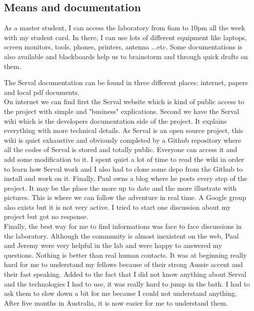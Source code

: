 \subsection{Means and documentation}
As a master student, I can access the laboratory from 6am to 10pm all the week with my student card. In there, I can use lots of different equipment like laptops, screen monitors, tools, phones, printers, antenna ...etc. Some documentations is also available and blackboards help us to brainstorm and through quick drafts on them.
\par
The Serval documentation can be found in three different places: internet, papers and local pdf documents. 
\\
On internet we can find first the Serval website which is kind of public access to the project with simple and "business" explications. Second we have the Serval wiki which is the developers documentation side of the project. It explains everything with more technical details. As Serval is an open source project, this wiki is quiet exhaustive and obviously completed by a Github repository where all the codes of Serval is stored and totally public. Everyone can access it and add some modification to it. I spent quiet a lot of time to read the wiki in order to learn how Serval work and I also had to clone some depo from the Github to install and work on it. Finally, Paul owns a blog where he posts every step of the project. It may be the place the more up to date and the more illustrate with pictures. This is where we can follow the adventure in real time. A Google group also exists but it is not very active. I tried to start one discussion about my project but got no response.
\\Finally, the best way for me to find informations was face to face discussions in the laboratory. Although the community is almost inexistent on the web, Paul and Jeremy were very helpful in the lab and were happy to answered my questions. Nothing is better than real human contacts. It was at beginning really hard for me to understand my fellows because of their strong Aussie accent and their fast speaking. Added to the fact that I did not know anything about Serval and the technologies I had to use, it was really hard to jump in the bath. I had to ask them to slow down a bit for me because I could not understand anything. After five months in Australia, it is now easier for me to understand them.  


